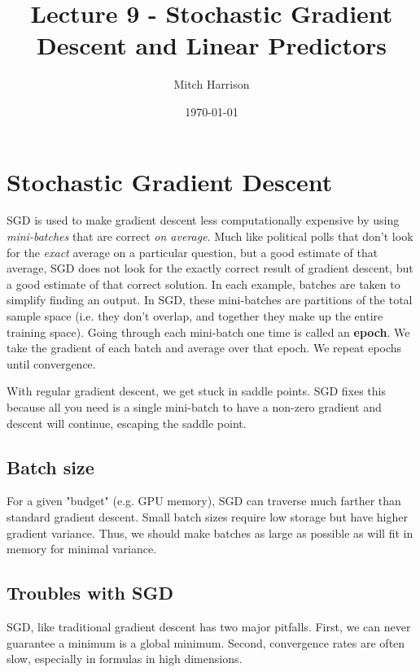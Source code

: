 \documentclass[titlepage, 12pt, leqno]{article}
\title{\Huge{Lecture 9 - Stochastic Gradient Descent and Linear Predictors}}
\author{\large{Mitch Harrison}}
\date{\today}
\begin{document}
\setlength{\parskip}{1\baselineskip}
\setlength{\parindent}{15pt}
\maketitle
\tableofcontents
\newpage


\section{Stochastic Gradient Descent}

SGD is used to make gradient descent less computationally expensive by using
\textit{mini-batches} that are correct \textit{on average}. Much like political
polls that don't look for the \textit{exact} average on a particular question, but
a good estimate of that average, SGD does not look for the exactly correct result
of gradient descent, but a good estimate of that correct solution. In each 
example, batches are taken to simplify finding an output. In SGD, these 
mini-batches are partitions of the total sample space (i.e. they don't overlap, 
and together they make up the entire training space). Going through each 
mini-batch one time is called an \textbf{epoch}. We take the gradient of each
batch and average over that epoch. We repeat epochs until convergence.

\begin{note}
    With regular gradient descent, we get stuck in saddle points. SGD fixes this
    because all you need is a single mini-batch to have a non-zero gradient and
    descent will continue, escaping the saddle point.
\end{note}

\subsection{Batch size}
For a given "budget" (e.g. GPU memory), SGD can traverse much farther than
standard gradient descent. Small batch sizes require low storage but have higher
gradient variance. Thus, we should make batches as large as possible as will fit
in memory for minimal variance.

\subsection{Troubles with SGD}
SGD, like traditional gradient descent has two major pitfalls. First, we can
never guarantee a minimum is a global minimum. Second, convergence rates are often
slow, especially in formulas in high dimensions.
\end{document}
